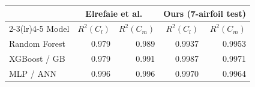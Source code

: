 \begin{tabular}{lrrrr}
\toprule
 & \multicolumn{2}{c}{Elrefaie et al.\ \cite{elrefaie2024}} & \multicolumn{2}{c}{Ours (7-airfoil test)} \\
\cmidrule(lr){2-3}\cmidrule(lr){4-5}
Model & $R^2(C_l)$ & $R^2(C_m)$ & $R^2(C_l)$ & $R^2(C_m)$ \\ \midrule
Random Forest & 0.979 & 0.989 & 0.9937 & 0.9953 \\
XGBoost / GB  & 0.979 & 0.991 & 0.9987 & 0.9971 \\
MLP / ANN     & 0.996 & 0.996 & 0.9970 & 0.9964 \\
\bottomrule
\end{tabular}
